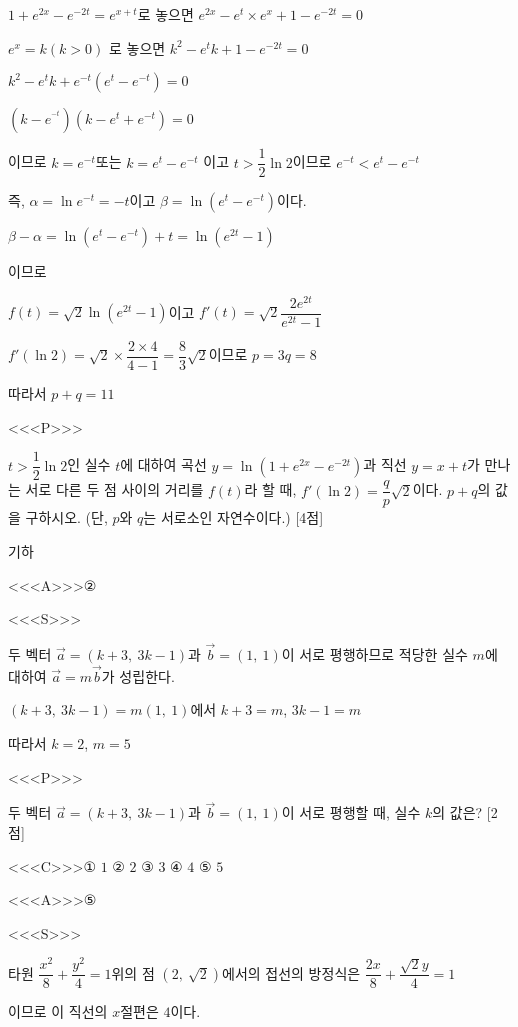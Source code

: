 \documentclass{oblivoir}
\begin{document}
$1+e^{2x}-e^{-2t}=e^{x+t}$로 놓으면 $e^{2x}-e^{t}\times e^{x}+1-e^{-2t}=0$

$e^{x}=k(k>0)$ 로 놓으면 $k^{2}-e^{t}k +1-e^{-2t}=0$

$k^{2}-e^{t}k+e^{-t}\left(e^{t}-e^{-t}\right)=0$

$\left(k-e^{^{-t}}\right)\left(k-e^{t}+e^{-t}\right)=0$

이므로 $k=e^{-t}$또는 $k =e^{t}-e^{-t}$ 이고 $t >\dfrac{1}{2}\ln 2$이므로 $e^{-t}< e^{t}-e^{-t}$

즉, $\alpha =\ln e^{-t}=-t$이고 $\beta =\ln\left(e^{t}-e^{-t}\right)$이다.

$\beta -\alpha =\ln\left(e^{t}-e^{-t}\right)+t =\ln\left(e^{2t}-1\right)$

이므로

$f(t)=\sqrt{2}\ln\left(e^{2t}-1\right)$이고 $f'(t)=\sqrt{2}\dfrac{2e^{2t}}{e^{2t}-1}$

$f'(\ln 2)=\sqrt{2}\times\dfrac{2\times 4}{4-1}=\dfrac{8}{3}\sqrt{2}$이므로 $p=3q=8$

따라서 $p+q=11$

<<<P>>>

$t >\dfrac{1}{2}\ln 2$인 실수 $t$에 대하여 곡선 $y=\ln(1+e^{2x}-e^{-2t})$과 직선 $y=x+t$가 만나는 서로 다른 두 점 사이의 거리를 $f(t)$라 할 때, $f'(\ln 2)=\dfrac{q}{p}\sqrt{2}$이다. $p+q$의 값을 구하시오. (단, $p$와 $q$는 서로소인 자연수이다.) [4점]

기하

<<<A>>>②

<<<S>>>

두 벡터 $\overrightarrow{a}=(k+3,\: 3k-1)$과 $\overrightarrow{b}=(1,\: 1)$이 서로 평행하므로 적당한 실수 $m$에 대하여 $\overrightarrow{a}=m\overrightarrow{b}$가 성립한다.

$(k+3,\: 3k-1)=m(1,\: 1)$에서 $k+3=m$, $3k-1=m$

따라서 $k=2$, $m=5$

<<<P>>>

두 벡터 $\overrightarrow{a}=(k+3,\: 3k-1)$과 $\overrightarrow{b}=(1,\: 1)$이 서로 평행할 때, 실수 $k$의 값은? [2점]

<<<C>>>① $1$ ② $2$ ③ $3$ ④ $4$ ⑤ $5$

<<<A>>>⑤

<<<S>>>

타원 $\dfrac{x^{2}}{8}+\dfrac{y^{2}}{4}=1$위의 점 $(2,\:\sqrt{2})$에서의 접선의 방정식은 $\dfrac{2x}{8}+\dfrac{\sqrt{2}y}{4}=1$

이므로 이 직선의 $x$절편은 $4$이다.
\end{document}
